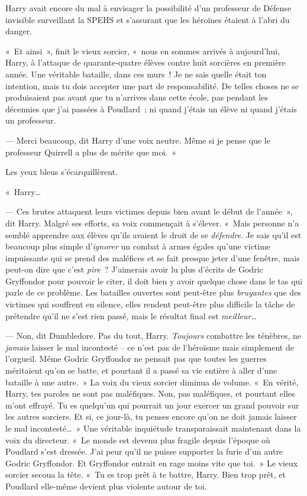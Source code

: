 Harry avait encore du mal à envisager la possibilité d'un professeur de Défense invisible surveillant la SPEHS et s'assurant que les héroïnes étaient à l'abri du danger.

«~Et ainsi~», finit le vieux sorcier, «~nous en sommes arrivés à aujourd'hui, Harry, à l'attaque de quarante-quatre élèves contre huit sorcières en première année.
Une véritable bataille, dans ces murs~!
Je ne sais quelle était ton intention, mais tu dois accepter une part de responsabilité.
De telles choses ne se produisaient pas avant que tu n'arrives dans cette école, pas pendant les décennies que j'ai passées à Poudlard~; ni quand j'étais un élève ni quand j'étais un professeur.

--- Merci beaucoup, dit Harry d'une voix neutre.
Même si je pense que le professeur Quirrell a plus de mérite que moi.~»

Les yeux bleus s'écarquillèrent.

«~Harry…

--- Ces brutes attaquent leurs victimes depuis bien avant le début de l'année~», dit Harry.
Malgré ses efforts, sa voix commençait à s'élever.
«~Mais personne n'a semblé apprendre aux élèves qu'ils avaient le droit de se \emph{défendre}.
Je sais qu'il est beaucoup plus simple d'\emph{ignorer} un combat à armes égales qu'une victime impuissante qui se prend des maléfices et se fait presque jeter d'une fenêtre, mais peut-on dire que c'est \emph{pire}~?
J'aimerais avoir lu plus d'écrits de Godric Gryffondor pour pouvoir le citer, il doit bien y avoir quelque chose dans le tas qui parle de ce problème.
Les batailles ouvertes sont peut-être plus \emph{bruyantes} que des victimes qui souffrent en silence, elles rendent peut-être plus difficile la tâche de prétendre qu'il ne s'est rien passé, mais le résultat final est \emph{meilleur}…

--- Non, dit Dumbledore.
Pas du tout, Harry.
\emph{Toujours} combattre les ténèbres, ne \emph{jamais} laisser le mal incontesté -- ce n'est pas de l'héroïsme mais simplement de l'orgueil.
Même Godric Gryffondor ne pensait pas que toutes les guerres méritaient qu'on se batte, et pourtant il a passé sa vie entière à aller d'une bataille à une autre.~»
La voix du vieux sorcier diminua de volume.
«~En vérité, Harry, tes paroles ne sont pas maléfiques.
Non, pas maléfiques, et pourtant elles m'ont effrayé.
Tu es quelqu'un qui pourrait un jour exercer un grand pouvoir sur les autres sorciers.
Et si, ce jour-là, tu penses encore qu'on ne doit jamais laisser le mal incontesté…~»
Une véritable inquiétude transparaissait maintenant dans la voix du directeur.
«~Le monde est devenu plus fragile depuis l'époque où Poudlard s'est dressée.
J'ai peur qu'il ne puisse supporter la furie d'un autre Godric Gryffondor.
Et Gryffondor entrait en rage moins vite que toi.~»
Le vieux sorcier secoua la tête.
«~Tu es trop prêt à te battre, Harry.
Bien trop prêt, et Poudlard elle-même devient plus violente autour de toi.

